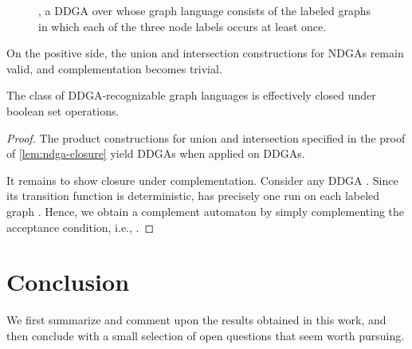 \documentclass[a4paper,11pt,twoside]{report} \pdfoutput=1
\begin{document}
\begin{SCfigure}[1.8][h!]
  \alignpic
     \caption{, a DDGA over
     whose graph
    language consists of the labeled graphs in which each of the three
    node labels occurs at least once.}
  \label{fig:ADGA_occur_abc}
\end{SCfigure}

On the positive side, the union and intersection constructions for
NDGAs remain valid, and complementation becomes trivial.

\begin{lemma} \label{lem:ddga-closure}
  The class  of DDGA-recognizable graph languages is
  effectively closed under boolean set operations.
\end{lemma}

\begin{proof}
  The product constructions for union and intersection specified in
  the proof of \cref{lem:ndga-closure} yield DDGAs when applied on
  DDGAs.

  It remains to show closure under complementation. Consider any DDGA
  . Since its transition function is
  deterministic,  has precisely one run on each labeled graph
  . Hence, we obtain a complement automaton 
  by simply complementing the acceptance condition, i.e.,
  .
\end{proof}
 

\chapter{Conclusion}
We first summarize and comment upon the results obtained in this work,
and then conclude with a small selection of open questions that seem
worth pursuing.
\end{document}
